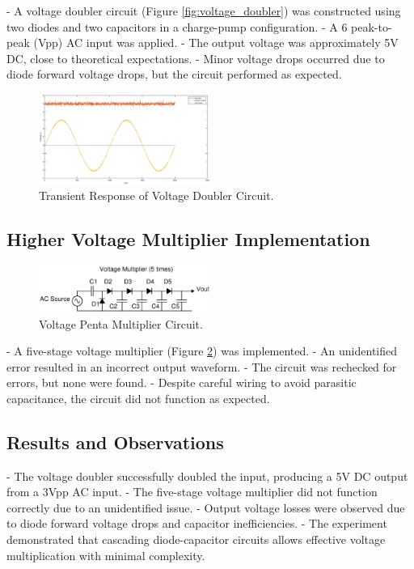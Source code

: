 \documentclass[9pt,conference]{IEEEtran}
\begin{document}
- A voltage doubler circuit (Figure \ref{fig:voltage_doubler}) was constructed using two diodes and two capacitors in a charge-pump configuration.
- A 6 peak-to-peak (Vpp) AC input was applied.
- The output voltage was approximately 5V DC, close to theoretical expectations.
- Minor voltage drops occurred due to diode forward voltage drops, but the circuit performed as expected.

\begin{figure}[H]
\centering
\includegraphics[width=0.5\textwidth]{doubler.eps}
\caption{\label{fig:transient_doubler}Transient Response of Voltage Doubler Circuit.}
\end{figure}

\subsection{Higher Voltage Multiplier Implementation}
\begin{figure}[H]
\centering
\includegraphics[width=0.5\textwidth]{penta_multiplier.eps}
\caption{\label{fig:voltage_penta}Voltage Penta Multiplier Circuit.}
\end{figure}

- A five-stage voltage multiplier (Figure \ref{fig:voltage_penta}) was implemented.
- An unidentified error resulted in an incorrect output waveform.
- The circuit was rechecked for errors, but none were found.
- Despite careful wiring to avoid parasitic capacitance, the circuit did not function as expected.

\subsection{Results and Observations}
- The voltage doubler successfully doubled the input, producing a 5V DC output from a 3Vpp AC input.
- The five-stage voltage multiplier did not function correctly due to an unidentified issue.
- Output voltage losses were observed due to diode forward voltage drops and capacitor inefficiencies.
- The experiment demonstrated that cascading diode-capacitor circuits allows effective voltage multiplication with minimal complexity.
\end{document}
